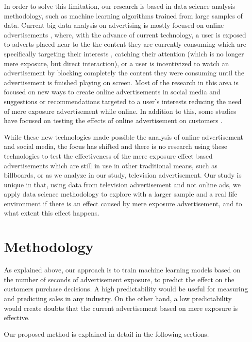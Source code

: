 \documentclass[review]{elsarticle}
\begin{document}
In order to solve this limitation, our research is based in data science analysis methodology, such as machine learning algorithms trained from large samples of data. Current big data analysis on advertising is mostly focused on online advertisements \cite{9, 24}, where, with the advance of current technology, a user is exposed to adverts placed near to the the content they are currently consuming which are specifically targeting their interests \cite{25,26}, catching their attention (which is no longer mere exposure, but direct interaction), or a user is incentivized to watch an advertisement by blocking completely the content they were consuming until the advertisement is finished playing on screen. Most of the research in this area is focused on new ways to create online advertisements in social media \cite{27} and suggestions or recommendations targeted to a user's interests \cite[e.g.][]{28,29,30,31} reducing the need of mere exposure advertisement while online. In addition to this, some studies have focused on testing the effects of online advertisement on customers \cite{32,33,34}.

While these new technologies made possible the analysis of online advertisement and social media, the focus has shifted and there is no research using these technologies to test the effectiveness of the mere exposure effect based advertisements which are still in use in other traditional means, such as billboards, or as we analyze in our study, television advertisement. Our study is unique in that, using data from television advertisement and not online ads, we apply data science methodology to explore with a larger sample and a real life environment if there is an effect caused by mere exposure advertisement, and to what extent this effect happens. 

\section{Methodology}
\label{method}

As explained above, our approach is to train machine learning models based on the number of seconds of advertisement exposure, to predict the effect on the customers purchase decisions. A high predictability would be useful for measuring and predicting sales in any industry. On the other hand, a low predictability would create doubts that the current advertisement based on mere exposure is effective.

Our proposed method is explained in detail in the following sections.
\end{document}
